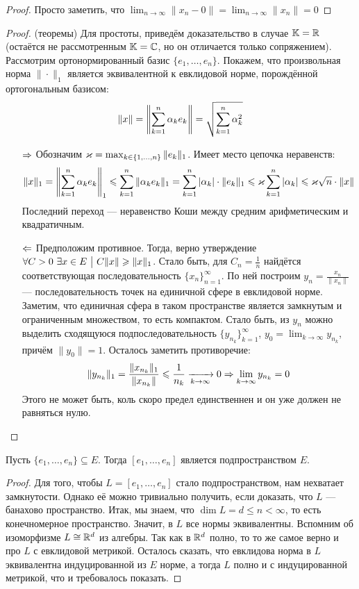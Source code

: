 \begin{proof}
	Просто заметить, что $\lim_{n \to \infty} \|x_n - 0\| = \lim_{n \to \infty} \|x_n\| = 0$
\end{proof}

\begin{proof} (теоремы)
	Для простоты, приведём доказательство в случае $\mathbb{K} = \mathbb{R}$ (остаётся не рассмотренным $\mathbb{K} = \mathbb{C}$, но он отличается только сопряжением). Рассмотрим ортонормированный базис $\{e_1, \ldots, e_n\}$. Покажем, что произвольная норма $\|\cdot\|_1$ является эквивалентной к евклидовой норме, порождённой ортогональным базисом:
	\[
		\|x\| = \left\|\sum_{k = 1}^n \alpha_k e_k\right\| = \sqrt{\sum_{k = 1}^n \alpha_k^2}
	\]
	\begin{itemize}
		\item[$\Rightarrow$] Обозначим $\varkappa = \max_{k \in \{1, \ldots, n\}} \|e_k\|_1$. Имеет место цепочка неравенств:
		\[
			\|x\|_1 = \left\|\sum_{k = 1}^n \alpha_ke_k\right\|_1 \leqslant \sum_{k = 1}^n \|\alpha_ke_k\|_1 = \sum_{k = 1}^n |\alpha_k| \cdot \|e_k\|_1 \leqslant \varkappa \sum_{k = 1}^n |\alpha_k| \leqslant \varkappa \sqrt{n} \cdot \|x\|
		\]
		Последний переход --- неравенство Коши между средним арифметическим и квадратичным.
		
		\item[$\Leftarrow$] Предположим противное. Тогда, верно утверждение $\forall C > 0\ \exists x \in E \ \big|\  C\|x\| \geqslant \|x\|_1$. Стало быть, для $C_n = \frac{1}{n}$ найдётся соответствующая последовательность $\{x_n\}_{n = 1}^\infty$. По ней построим $y_n = \frac{x_n}{\|x_n\|}$ --- последовательность точек на единичной сфере в евклидовой норме. Заметим, что единичная сфера в таком пространстве является замкнутым и ограниченным множеством, то есть компактом. Стало быть, из $y_n$ можно выделить сходящуюся подпоследовательность $\{y_{n_k}\}_{k = 1}^\infty$, $y_0 = \lim_{k \to \infty} y_{n_k}$, причём $\|y_0\| = 1$. Осталось заметить противоречие:
		\[
			\|y_{n_k}\|_1 = \frac{\|x_{n_k}\|_1}{\|x_{n_k}\|} \leqslant \frac{1}{n_k} \xrightarrow[k \to \infty]{} 0 \Rightarrow \lim_{k \to \infty} y_{n_k} = 0
		\]
		Этого не может быть, коль скоро предел единственнен и он уже должен не равняться нулю.
	\end{itemize}
\end{proof}

\begin{theorem}
	Пусть $\{e_1, \ldots, e_n\} \subseteq E$. Тогда $[e_1, \ldots, e_n]$ является подпространством $E$.
\end{theorem}

\begin{proof}
	Для того, чтобы $L = [e_1, \ldots, e_n]$ стало подпространством, нам нехватает замкнутости. Однако её можно тривиально получить, если доказать, что $L$ --- банахово пространство. Итак, мы знаем, что $\dim L = d \le n < \infty$, то есть конечномерное пространство. Значит, в $L$ все нормы эквивалентны. Вспомним об изоморфизме $L \cong \mathbb{R}^d$ из алгебры. Так как в $\mathbb{R}^d$ полно, то то же самое верно и про $L$ с евклидовой метрикой. Осталось сказать, что евклидова норма в $L$ эквивалентна индуцированной из $E$ норме, а тогда $L$ полно и с индуцированной метрикой, что и требовалось показать.
\end{proof}


